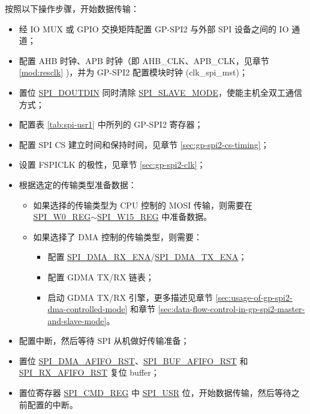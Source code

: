 \documentclass[main\_\_CN.tex]{subfiles}
\begin{document}
按照以下操作步骤，开始数据传输：
\begin{itemize}
    \item 经 IO MUX 或 GPIO 交换矩阵配置 GP-SPI2 与外部 SPI 设备之间的 IO 通道； 
    \item 配置 AHB 时钟、APB 时钟（即 AHB\_CLK、APB\_CLK，见章节 \ref{mod:resclk} \textit{})，并为 GP-SPI2 配置模块时钟 (clk\_spi\_mst)；
    \item 置位 \hyperref[fielddesc:SPIDOUTDIN]{SPI\_DOUTDIN} 同时清除 \hyperref[fielddesc:SPISLAVEMODE]{SPI\_SLAVE\_MODE}，使能主机全双工通信方式；
    
    \item 配置表 \ref{tab:spi-usr1} 中所列的 GP-SPI2 寄存器；
    
    \item 配置 SPI CS 建立时间和保持时间，见章节  \ref{sec:gp-spi2-cs-timing}；
    
    \item 设置 FSPICLK 的极性，见章节  \ref{sec:gp-spi2-clk}；
    
    \item 根据选定的传输类型准备数据：
    \begin{itemize}
        \item 如果选择的传输类型为 CPU 控制的 MOSI 传输，则需要在 \hyperref[regdesc:SPIW0REG]{SPI\_W0\_REG}$\sim$\hyperref[regdesc:SPIW15REG]{SPI\_W15\_REG} 中准备数据。 
        
        \item 如果选择了 DMA 控制的传输类型，则需要： 
        \begin{itemize}
            \item 配置 \hyperref[fielddesc:SPIDMARXENA]{SPI\_DMA\_RX\_ENA}/\hyperref[fielddesc:SPIDMATXENA]{SPI\_DMA\_TX\_ENA}；
            \item 配置 GDMA TX/RX 链表；
            \item 启动 GDMA TX/RX 引擎，更多描述见章节 \ref{sec:usage-of-gp-spi2-dma-controlled-mode} 和章节 \ref{sec:data-flow-control-in-gp-spi2-master-and-slave-mode}。
        \end{itemize}
    \end{itemize}
    \item 配置中断，然后等待 SPI 从机做好传输准备；
    
    \item 置位 \hyperref[fielddesc:SPIDMAAFIFORST]{SPI\_DMA\_AFIFO\_RST}、\hyperref[fielddesc:SPIBUFAFIFORST]{SPI\_BUF\_AFIFO\_RST} 和 \hyperref[fielddesc:SPIRXAFIFORST]{SPI\_RX\_AFIFO\_RST} 复位 buffer；

    \item 置位寄存器 \hyperref[regdesc:SPICMDREG]{SPI\_CMD\_REG} 中 \hyperref[fielddesc:SPIUSR]{SPI\_USR} 位，开始数据传输，然后等待之前配置的中断。

\end{itemize}
\end{document}
